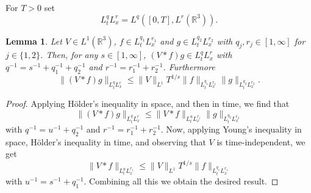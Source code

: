 \documentclass[11pt,a4paper,draft,DIV11]{scrartcl}	%
\newtheorem{lem}[thm]{Lemma}
\newcommand{\R}{\mathds{R}}
\begin{document}
For $T > 0$ set
\[
  L_t^q L_x^r = L^q([0,T], L^r(\R^3)).
\]


\begin{lem} \label{l:interp}
  Let $V \in L^1(\R^3)$, $f \in L_t^{q_1} L_x^{r_1}$ and $g \in L_t^{q_2}
  L_x^{r_2}$ with $q_j, r_j \in [1,\infty]$ for $j \in \{1,2\}$. Then, for any $s \in [1, \infty]$, $(V * f)
  g \in L_t^q L_x^r$ with $q^{-1} = s^{-1} + q_1^{-1} + q_2^{-1}$ and $r^{-1}
  = r_1^{-1} + r_2^{-1}$. Furthermore
  \[
    \| (V * f)g \|_{L_t^q L_x^r} \le \| V \|_{L^1} T^{1/s} \| f \|_{L_t^{q_1}
    L_x^{r_1}} \| g \|_{L_t^{q_2} L_x^{r_2}}.
  \]
\end{lem}


\begin{proof}
  Applying H\"older's inequality in space, and then in time, we find that
  \[
    \| (V * f) g \|_{L_t^q L_x^r} \le \| V * f \|_{L_t^u L_x^{r_1}} \| g
    \|_{L_t^{q_2} L_x^{r_2}}
  \]
  with $q^{-1} = u^{-1} + q_2^{-1}$ and $r^{-1} = r_1^{-1} + r_2^{-1}$. Now,
  applying Young's inequality in space, H\"older's inequality in time, and
  observing that $V$ is time-independent, we get
  \[
    \| V * f \|_{L_t^u L_x^{r_1}} \le \| V \|_{L^1} T^{1/s} \| f \|_{L_t^{q_1}
    L_x^{r_1}}
  \]
  with $u^{-1} = s^{-1} + q_1^{-1}$. Combining all this we obtain the desired
  result.
\end{proof}
\end{document}
